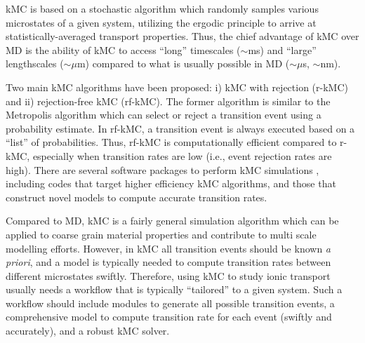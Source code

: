 \documentclass[a4paper,fleqn]{cas-dc}
\begin{document}
kMC is based on a stochastic algorithm which randomly samples various microstates of a given system, utilizing the ergodic principle to arrive at statistically-averaged transport properties. Thus, the chief advantage of kMC over MD is the ability of kMC to access ``long'' timescales ($\sim$ms) and ``large'' lengthscales ($\sim\mu$m) compared to what is usually possible in MD ($\sim\mu$s, $\sim$nm)\cite{gao_design_2022}.

Two main kMC algorithms have been proposed: i) kMC with rejection (r-kMC)\cite{hastings_monte_1970} and ii) rejection-free kMC (rf-kMC)\cite{bortz_new_1975}. The former algorithm is similar to the Metropolis algorithm\cite{hastings_monte_1970} which can select or reject a transition event using a probability estimate. In rf-kMC, a transition event is always executed based on a ``list'' of probabilities. Thus, rf-kMC is computationally efficient compared to r-kMC, especially when transition rates are low (i.e., event rejection rates are high). There are several software packages to perform kMC simulations \cite{magna_lattice_1999,dooling_generic_2001,boerrigter_monty_2004,leetmaa_kmclib_2014,Hoffmann2014a,ramsey_james_j_kmcthinfilm_2015,mitchell_global_2016,danielson_sqertss_2017,jorgensen_montecoffee_2018,li_crystal-kmc_2018,li_openkmc_2019,martin_kimera_2020}, including codes that target higher efficiency kMC algorithms\cite{schulze_kinetic_2002,bernacki_multiple_2004,shi_parallel_2007,xu_adaptive_2008,slepoy_constant-time_2008,chatterjee_accurate_2010,nielsen_parallel_2013}, and those that construct novel models to compute accurate transition rates\cite{xu_simulating_2011,konwar_off-lattice_2011,stamatakis_graph-theoretical_2011,guo_--fly_2015,yang_learning_2017}.

Compared to MD, kMC is a fairly general simulation algorithm which can be applied to coarse grain material properties and contribute to multi scale modelling efforts\cite{chatterjee_multiscale_2006,collins_coarse-grained_2008,deng_towards_2022}. However, in kMC all transition events should be known \emph{a priori}, and a model is typically needed to compute transition rates between different microstates swiftly. Therefore, using kMC to study ionic transport usually needs a workflow that is typically ``tailored'' to a given system. Such a workflow should include  modules to generate all possible transition events, a comprehensive model to compute transition rate for each event (swiftly and accurately), and a robust kMC solver.
\end{document}
